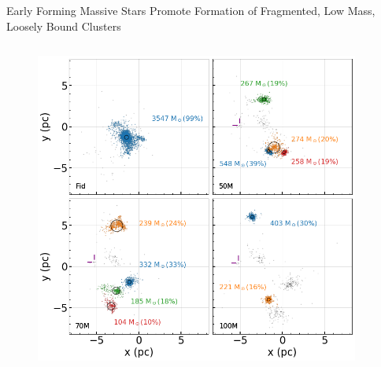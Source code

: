 \documentclass[aspectratio=169]{beamer}
\begin{document}
\begin{frame}{Early Forming Massive Stars Promote Formation of Fragmented, Low Mass, Loosely Bound Clusters}{}
    \begin{columns}
        \begin{column}{0.45\textwidth}
            \begin{figure}[h!]
                \centering
                \includegraphics[width=\linewidth]{../images/cluster_grid.png} \\
                \label{fig:cluster_grid}
            \end{figure}
        \end{column}
        \begin{column}{0.45\textwidth}
            \begin{itemize}

\end{itemize}
\end{column}
\end{columns}
\end{frame}
\end{document}
